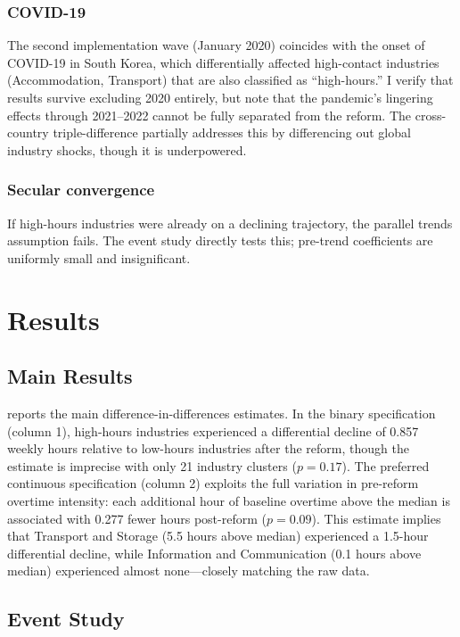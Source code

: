\documentclass[12pt]{article}
\begin{document}
\subsubsection*{COVID-19} The second implementation wave (January 2020) coincides with the onset of COVID-19 in South Korea, which differentially affected high-contact industries (Accommodation, Transport) that are also classified as ``high-hours.'' I verify that results survive excluding 2020 entirely, but note that the pandemic's lingering effects through 2021--2022 cannot be fully separated from the reform. The cross-country triple-difference partially addresses this by differencing out global industry shocks, though it is underpowered.

\subsubsection*{Secular convergence} If high-hours industries were already on a declining trajectory, the parallel trends assumption fails. The event study directly tests this; pre-trend coefficients are uniformly small and insignificant.

\section{Results}
\label{sec:results}

\subsection{Main Results}

 reports the main difference-in-differences estimates. In the binary specification (column 1), high-hours industries experienced a differential decline of 0.857 weekly hours relative to low-hours industries after the reform, though the estimate is imprecise with only 21 industry clusters ($p = 0.17$). The preferred continuous specification (column 2) exploits the full variation in pre-reform overtime intensity: each additional hour of baseline overtime above the median is associated with 0.277 fewer hours post-reform ($p = 0.09$). This estimate implies that Transport and Storage (5.5 hours above median) experienced a 1.5-hour differential decline, while Information and Communication (0.1 hours above median) experienced almost none---closely matching the raw data.



\subsection{Event Study}
\end{document}
